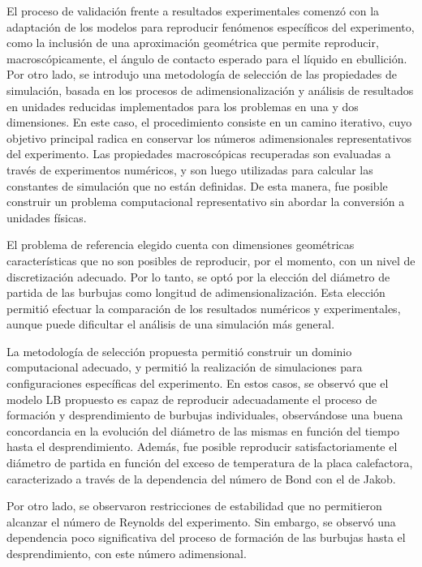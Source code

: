 El proceso de validaci\'on frente a resultados experimentales comenz\'o con la adaptaci\'on de los modelos para reproducir fen\'omenos espec\'ificos del experimento, como la inclusi\'on de una aproximaci\'on geom\'etrica que permite reproducir, macrosc\'opicamente, el \'angulo de contacto esperado para el l\'iquido en ebullici\'on.  Por otro lado, se introdujo una metodolog\'ia de selecci\'on de las propiedades de simulaci\'on, basada en los procesos de adimensionalizaci\'on y an\'alisis de resultados en unidades reducidas implementados para los problemas en una y dos dimensiones. En este caso, el procedimiento consiste en un camino iterativo, cuyo objetivo principal radica en conservar los n\'umeros adimensionales representativos del experimento. Las propiedades macrosc\'opicas recuperadas son evaluadas a trav\'es de experimentos num\'ericos, y son luego utilizadas para calcular las constantes de simulaci\'on que no est\'an definidas. De esta manera, fue posible construir un problema computacional representativo sin abordar la conversi\'on a unidades f\'isicas.

El problema de referencia elegido cuenta con dimensiones geom\'etricas caracter\'isticas que no son posibles de reproducir, por el momento, con un nivel de discretizaci\'on adecuado. Por lo tanto, se opt\'o por la elecci\'on del di\'ametro de partida de las burbujas como longitud de adimensionalizaci\'on. Esta elecci\'on permiti\'o efectuar la comparaci\'on de los resultados num\'ericos y experimentales, aunque puede dificultar el an\'alisis de una simulaci\'on m\'as general.

La metodolog\'ia de selecci\'on propuesta permiti\'o construir un dominio computacional adecuado, y permiti\'o la realizaci\'on de simulaciones para configuraciones espec\'ificas del experimento. En estos casos, se observ\'o que el modelo LB propuesto es capaz de reproducir adecuadamente el proceso de formaci\'on y desprendimiento de burbujas individuales, observ\'andose una buena concordancia en la evoluci\'on del di\'ametro de las mismas en funci\'on del tiempo hasta el desprendimiento. Adem\'as, fue posible reproducir satisfactoriamente el di\'ametro de partida en funci\'on del exceso de temperatura de la placa calefactora, caracterizado a trav\'es de la dependencia del n\'umero de Bond con el de Jakob. 

Por otro lado, se observaron restricciones de estabilidad que no permitieron alcanzar el n\'umero de Reynolds del experimento. Sin embargo, se observ\'o una dependencia poco significativa del proceso de formaci\'on de las burbujas hasta el desprendimiento, con este n\'umero adimensional.